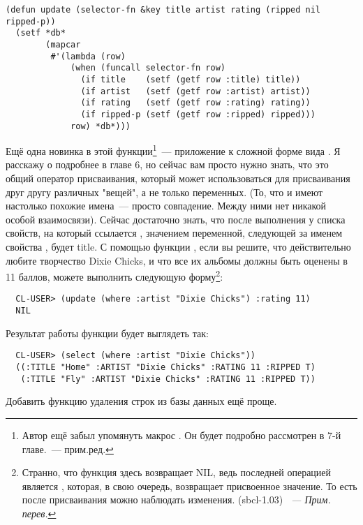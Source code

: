 \begin{lstlisting}
(defun update (selector-fn &key title artist rating (ripped nil ripped-p))
  (setf *db*
        (mapcar
         #'(lambda (row)
             (when (funcall selector-fn row)
               (if title    (setf (getf row :title) title))
               (if artist   (setf (getf row :artist) artist))
               (if rating   (setf (getf row :rating) rating))
               (if ripped-p (setf (getf row :ripped) ripped)))
             row) *db*)))
\end{lstlisting}

Ещё одна новинка в этой функции\footnote{Автор ещё забыл упомянуть макрос . Он
  будет подробно рассмотрен в 7-й главе.~--- прим.ред.}~--- приложение  к
сложной форме вида . Я расскажу о  подробнее в главе 6,
но сейчас вам просто нужно знать, что это общий оператор присваивания, который может
использоваться для присваивания друг другу различных "вещей", а не только переменных. (То,
что  и  имеют настолько похожие имена~--- просто совпадение. Между
ними нет никакой особой взаимосвязи). Сейчас достаточно знать, что после выполнения
 у списка свойств, на который ссылается ,
значением переменной, следующей за именем свойства , будет title. С помощью
функции , если вы решите, что действительно любите творчество Dixie Chicks, и
что все их альбомы должны быть оценены в 11 баллов, можете выполнить следующую
форму\footnote{Странно, что функция  здесь возвращает NIL, ведь последней
  операцией является , которая, в свою очередь, возвращает
  присвоенное значение. То есть после присваивания можно наблюдать изменения. (sbcl-1.03)
  \textit{~--- Прим. перев.}}:

\begin{verbatim}
  CL-USER> (update (where :artist "Dixie Chicks") :rating 11)
  NIL
\end{verbatim}

Результат работы функции будет выглядеть так:

\begin{verbatim}
  CL-USER> (select (where :artist "Dixie Chicks"))
  ((:TITLE "Home" :ARTIST "Dixie Chicks" :RATING 11 :RIPPED T)
   (:TITLE "Fly" :ARTIST "Dixie Chicks" :RATING 11 :RIPPED T))
\end{verbatim}

Добавить функцию удаления строк из базы данных ещё проще.

